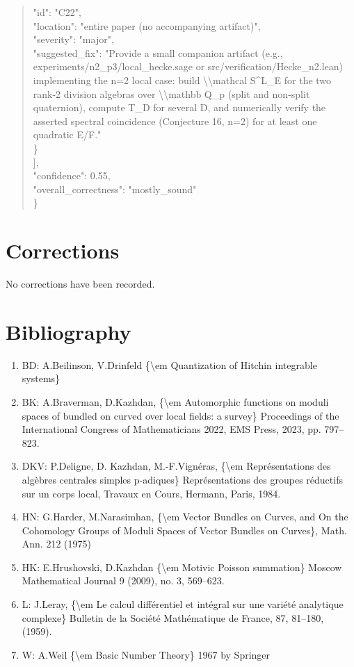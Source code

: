 \documentclass[11pt]{article}
\begin{document}
\begin{quote}
      "id": "C22",\\
      "location": "entire paper (no accompanying artifact)",\\
      "severity": "major",\\
      "suggested\_fix": "Provide a small companion artifact (e.g., experiments/n2\_p3/local\_hecke.sage or src/verification/Hecke\_n2.lean) implementing the n=2 local case: build \textbackslash{}\textbackslash{}mathcal S\^{}L\_E for the two rank-2 division algebras over \textbackslash{}\textbackslash{}mathbb Q\_p (split and non-split quaternion), compute T\_D for several D, and numerically verify the asserted spectral coincidence (Conjecture 16, n=2) for at least one quadratic E/F."\\
    \}\\
  ],\\
  "confidence": 0.55,\\
  "overall\_correctness": "mostly\_sound"\\
\}\\
\end{quote}

\section*{Corrections}
No corrections have been recorded.

\section*{Bibliography}
\begin{enumerate}[leftmargin=*]
  \item BD: A.Beilinson, V.Drinfeld \{\textbackslash{}em Quantization of Hitchin integrable systems\}
  \item BK: A.Braverman, D.Kazhdan, \{\textbackslash{}em Automorphic functions on moduli spaces of bundled on curved over local fields: a survey\} Proceedings of the International Congress of Mathematicians 2022, EMS Press, 2023, pp. 797--823.
  \item DKV: P.Deligne, D. Kazhdan, M.-F.Vignéras, \{\textbackslash{}em Représentations des algèbres centrales simples p-adiques\} Représentations des groupes réductifs sur un corps local, Travaux en Cours, Hermann, Paris, 1984.
  \item HN: G.Harder, M.Narasimhan, \{\textbackslash{}em Vector Bundles on Curves, and On the Cohomology Groups of Moduli Spaces of Vector Bundles on Curves\}, Math. Ann. 212 (1975)
  \item HK: E.Hrushovski, D.Kazhdan \{\textbackslash{}em Motivic Poisson summation\} Moscow Mathematical Journal 9 (2009), no. 3, 569--623.
  \item L: J.Leray, \{\textbackslash{}em Le calcul différentiel et intégral sur une variété analytique complexe\} Bulletin de la Société Mathématique de France, 87, 81--180, (1959).
  \item W: A.Weil \{\textbackslash{}em Basic Number Theory\} 1967 by Springer
\end{enumerate}

% 
% 
\end{document}
